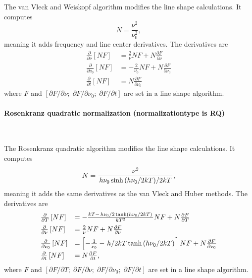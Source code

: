 The van Vleck and Weiskopf algorithm modifies the line shape calculations. It computes
\begin{equation}
 N = \frac{\nu^2}{\nu^2_0},
\end{equation}
meaning it adds frequency and line center derivatives.  The derivatives are
\begin{equation}
 \begin{array}{ll}
  \frac{\partial}{\partial \nu} \left[NF\right] &= \frac{2}{\nu} NF + N\frac{\partial F}{\partial \nu} \\[5pt]
  \frac{\partial}{\partial \nu_0} \left[NF\right] &= -\frac{2}{\nu_0} NF + N\frac{\partial F}{\partial \nu_0} \\[5pt]
  \frac{\partial}{\partial t} \left[NF\right] &= N\frac{\partial F}{\partial \nu_0}
 \end{array}
\end{equation}
where $F$ and $[\partial F / \partial \nu;\; \partial F / \partial \nu_0;\; \partial F / \partial t]$ are set in a line shape algorithm.

\paragraph*{Rosenkranz quadratic normalization (normalizationtype is RQ)} \

The Rosenkranz quadratic algorithm modifies the line shape calculations. It computes
\begin{equation}
 N = \frac{\nu^2 }{\left. h\nu_0 \sinh\left( h\nu_0 \middle/ 2kT \right) \middle/ 2kT \right.},
\end{equation}
meaning it adds the same derivatives as the van Vleck and Huber methods. The derivatives are
\begin{equation}
 \begin{array}{ll}
  \frac{\partial}{\partial T}  \left[NF\right] &= -\frac{kT -
  \left.{h\nu_0}\middle/{2 \tanh\left(h\nu_0 \middle/ 2kT\right)}\right.}{kT^2}NF + N\frac{\partial F}{\partial T} \\[5pt]
  \frac{\partial}{\partial \nu}  \left[NF\right] &= \frac{2}{\nu}NF + N\frac{\partial F}{\partial \nu} \\[5pt]
  \frac{\partial}{\partial \nu_0}  \left[NF\right] &= 
  \left[- \frac{1}{\nu_0} - \left. h \middle/ 2kT \tanh\left(h\nu_0 \middle/2kT\right)\right. \right]  NF + N\frac{\partial F}{\partial \nu_0} \\[5pt]
  \frac{\partial}{\partial t}  \left[NF\right] &= N\frac{\partial F}{\partial t},
 \end{array}
\end{equation}
where $F$ and $[\partial F / \partial T;\; \partial F / \partial \nu;\; \partial F / \partial \nu_0;\; \partial F / \partial t]$ are set in a line shape algorithm.

